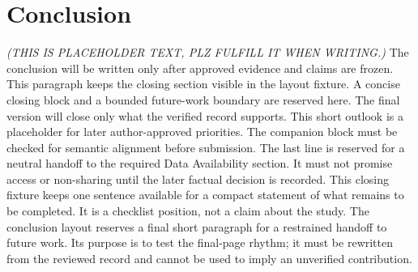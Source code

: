 \section{Conclusion}\label{sec:conclusion}
\textit{(THIS IS PLACEHOLDER TEXT, PLZ FULFILL IT WHEN WRITING.)}
The conclusion will be written only after approved evidence and claims are frozen. This paragraph keeps the closing section visible in the layout fixture.
A concise closing block and a bounded future-work boundary are reserved here.
The final version will close only what the verified record supports.
This short outlook is a placeholder for later author-approved priorities.
The companion block must be checked for semantic alignment before submission.
The last line is reserved for a neutral handoff to the required Data Availability section. It must not promise access or non-sharing until the later factual decision is recorded.
This closing fixture keeps one sentence available for a compact statement of what remains to be completed. It is a checklist position, not a claim about the study.
The conclusion layout reserves a final short paragraph for a restrained handoff to future work. Its purpose is to test the final-page rhythm; it must be rewritten from the reviewed record and cannot be used to imply an unverified contribution.
\nocite{placeholder-method,placeholder-guideline}
